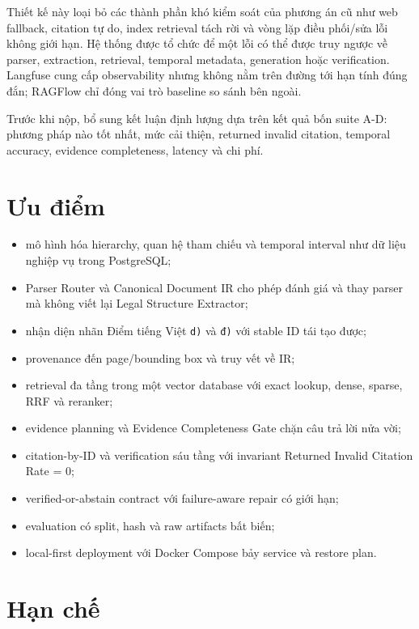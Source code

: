 \documentclass[a4paper,12pt]{extreport}
\newif\ifdraftmode
\newcommand{\pendingresult}[1]{%
  \ifdraftmode
  \begin{center}
  \fcolorbox{DraftBorder}{DraftYellow}{%
    \parbox{0.90\textwidth}{\textbf{Nội dung chờ cập nhật:} #1}
  }
  \end{center}
  \else
  #1
  \fi
}
\newcommand{\code}[1]{\texttt{#1}}
\begin{document}
Thiết kế này loại bỏ các thành phần khó kiểm soát của phương án cũ như web fallback, citation tự do, index retrieval tách rời và vòng lặp điều phối/sửa lỗi không giới hạn. Hệ thống được tổ chức để một lỗi có thể được truy ngược về parser, extraction, retrieval, temporal metadata, generation hoặc verification. Langfuse cung cấp observability nhưng không nằm trên đường tới hạn tính đúng đắn; RAGFlow chỉ đóng vai trò baseline so sánh bên ngoài.

\pendingresult{Trước khi nộp, bổ sung kết luận định lượng dựa trên kết quả bốn suite A-D: phương pháp nào tốt nhất, mức cải thiện, returned invalid citation, temporal accuracy, evidence completeness, latency và chi phí.}

\section{Ưu điểm}

\begin{itemize}
  \item mô hình hóa hierarchy, quan hệ tham chiếu và temporal interval như dữ liệu nghiệp vụ trong PostgreSQL;
  \item Parser Router và Canonical Document IR cho phép đánh giá và thay parser mà không viết lại Legal Structure Extractor;
  \item nhận diện nhãn Điểm tiếng Việt \code{d)} và \code{đ)} với stable ID tái tạo được;
  \item provenance đến page/bounding box và truy vết về IR;
  \item retrieval đa tầng trong một vector database với exact lookup, dense, sparse, RRF và reranker;
  \item evidence planning và Evidence Completeness Gate chặn câu trả lời nửa vời;
  \item citation-by-ID và verification sáu tầng với invariant Returned Invalid Citation Rate = 0;
  \item verified-or-abstain contract với failure-aware repair có giới hạn;
  \item evaluation có split, hash và raw artifacts bất biến;
  \item local-first deployment với Docker Compose bảy service và restore plan.
\end{itemize}

\section{Hạn chế}
\end{document}
